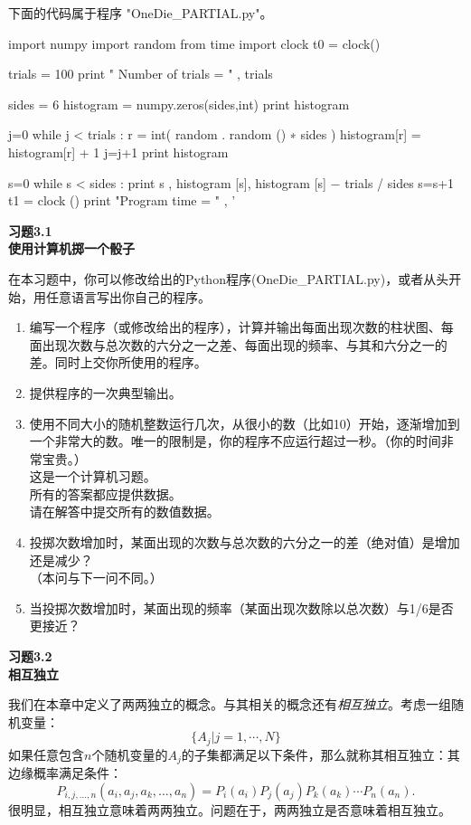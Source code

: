 \documentclass[UTF8]{ctexart}
\numberwithin{equation}{section}%
\numberwithin{figure}{section}%
\begin{document}
    下面的代码属于程序 "OneDie\_PARTIAL.py"。

    \begin{python}
    import numpy
    import random
    from time import clock
    t0 = clock()

    trials = 100
    print " Number of trials = " , trials

    sides = 6
    histogram = numpy.zeros(sides,int)
    print histogram

    j=0
    while j < trials :
        r = int( random . random () ∗ sides )
        histogram[r] = histogram[r] + 1
        j=j+1
    print histogram

    s=0
    while s < sides :
        print s , histogram [s], histogram [s] − trials / sides
        s=s+1
    t1 = clock ()
    print "\n Program time = " , ’%
    \end{python}
    \textbf{习题3.1}\\
    \textbf{使用计算机掷一个骰子}
    
    在本习题中，你可以修改给出的Python程序(OneDie\_PARTIAL.py)，或者从头开始，用任意语言写出你自己的程序。
    \begin{enumerate}
        \item 编写一个程序（或修改给出的程序），计算并输出每面出现次数的柱状图、每面出现次数与总次数的六分之一之差、每面出现的频率、与其和六分之一的差。同时上交你所使用的程序。
        \item 提供程序的一次典型输出。
        \item 使用不同大小的随机整数运行几次，从很小的数（比如10）开始，逐渐增加到一个非常大的数。唯一的限制是，你的程序不应运行超过一秒。（你的时间非常宝贵。）\\
        {\kaishu 这是一个计算机习题。\\所有的答案都应提供数据。}\\请在解答中提交所有的数值数据。
        \item 投掷次数增加时，某面出现的次数与总次数的六分之一的差（绝对值）是增加还是减少？\\（本问与下一问不同。）
        \item 当投掷次数增加时，某面出现的频率（某面出现次数除以总次数）与1/6是否更接近？
    \end{enumerate}
    \textbf{习题3.2}\label{prob3.2}\\
    \textbf{相互独立}

    我们在本章中定义了两两独立的概念。与其相关的概念还有\textit{相互独立}。考虑一组随机变量：
    $$\{A_j|j=1,\cdots,N\}$$
    如果任意包含$n$个随机变量的${A_j}$的子集都满足以下条件，那么就称其相互独立：其边缘概率满足条件：
    \begin{equation}
        P_{i, j, \ldots, n}\left(a_{i}, a_{j}, a_{k}, \ldots, a_{n}\right)=P_{i}\left(a_{i}\right) P_{j}\left(a_{j}\right) P_{k}\left(a_{k}\right) \cdots P_{n}\left(a_{n}\right).
    \end{equation}
    很明显，相互独立意味着两两独立。问题在于，两两独立是否意味着相互独立。
\end{document}
